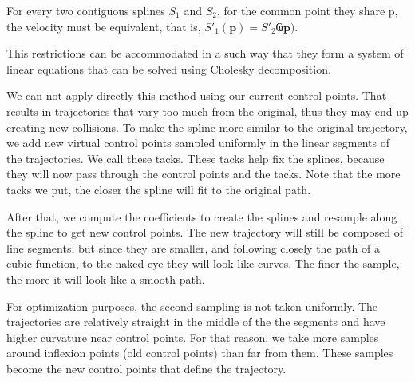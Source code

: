 For every two contiguous splines $S_1$ and $S_2$, for the common point they share p, the velocity must be equivalent, that is,  $S'_1(\mathbf{p})=S'_2Ҩ\mathbf{p})$.
  
This restrictions can be accommodated in a such way that they form a system of linear equations that can be solved using Cholesky decomposition.

We can not apply directly this method using our current control points. That results in trajectories that vary too much from the original, thus they may end up creating new collisions. To make the spline more similar to the original trajectory, we add new virtual control points sampled uniformly in the linear segments of the trajectories. We call these tacks. These tacks help fix the splines, because they will now pass through the control points and the tacks. Note that the more tacks we put, the closer the spline will fit to the original path.

After that, we compute the coefficients to create the splines and resample along the spline to get new control points. The new trajectory will still be composed of line segments, but since they are smaller, and following closely the path of a cubic function, to the naked eye they will look like curves. The finer the sample, the more it will look like a smooth path.

For optimization purposes, the second sampling is not taken uniformly. The trajectories are relatively straight in the middle of the the segments and have higher curvature near control points. For that reason, we take more samples around inflexion points (old control points) than far from them. These samples become the new control points that define the trajectory.

